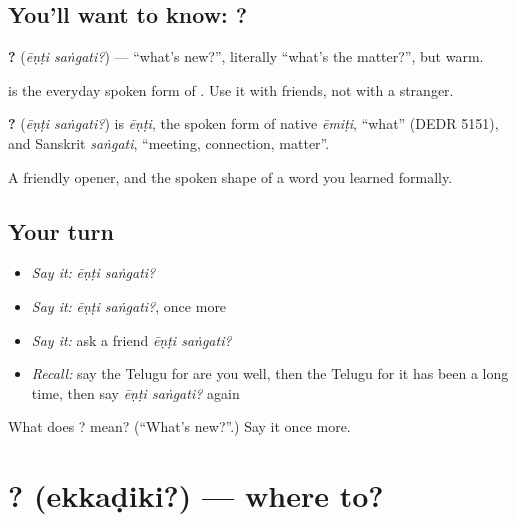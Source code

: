 \subsection*{You'll want to know:  ?}
\textbf{ ?} (\emph{ēṇṭi saṅgati?}) — \textquotedblleft{}what's new?\textquotedblright{}, literally \textquotedblleft{}what's the matter?\textquotedblright{}, but warm.

\textbf{} is the everyday spoken form of \textbf{}. Use it with friends, not with a stranger.

\begin{cousinweb}
\textbf{ ?} (\emph{ēṇṭi saṅgati?}) is \emph{ēṇṭi}, the spoken form of native \emph{ēmiṭi}, \textquotedblleft{}what\textquotedblright{} (DEDR 5151), and Sanskrit \emph{saṅgati}, \textquotedblleft{}meeting, connection, matter\textquotedblright{}.
\end{cousinweb}

\begin{grammarlens}[title={What you've built}]
A friendly opener, and the spoken shape of a word you learned formally.
\end{grammarlens}

\subsection*{Your turn}
\begin{itemize}
\raggedright
  \item \emph{Say it:} \emph{ēṇṭi saṅgati?}
  \item \emph{Say it:} \emph{ēṇṭi saṅgati?}, once more
  \item \emph{Say it:} ask a friend \emph{ēṇṭi saṅgati?}
  \item \emph{Recall:} say the Telugu for are you well, then the Telugu for it has been a long time, then say \emph{ēṇṭi saṅgati?} again
\end{itemize}

\begin{tcolorbox}[breakable,colback=teal!4,colframe=teal!35!black,title={Before you move on}]
What does  ? mean? (\textquotedblleft{}What's new?\textquotedblright{}.) Say it once more.
\end{tcolorbox}
\section[\texorpdfstring{\te{ఎక్కడికి}? (ekkaḍiki?)}{ఎక్కడికి? (ekkaḍiki?)}]{? (ekkaḍiki?) — where to?}

